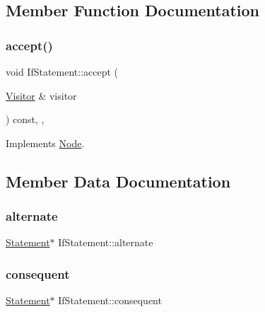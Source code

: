 \subsection{Member Function Documentation}
\mbox{\label{struct_if_statement_a3b9cacb85a094dfe27646324769a1d2f}} 
\subsubsection{\texorpdfstring{accept()}{accept()}}
{\footnotesize\ttfamily void If\+Statement\+::accept (\begin{DoxyParamCaption}\item[{\hyperlink{struct_visitor}{Visitor} \&}]{visitor }\end{DoxyParamCaption}) const\hspace{0.3cm}{\ttfamily [inline]}, {\ttfamily [override]}, {\ttfamily [virtual]}}



Implements \hyperlink{struct_node_a10bd7af968140bbf5fa461298a969c71}{Node}.



\subsection{Member Data Documentation}
\mbox{\label{struct_if_statement_ab0ee82460f6279444d526b2fff26584b}} 
\subsubsection{\texorpdfstring{alternate}{alternate}}
{\footnotesize\ttfamily \hyperlink{struct_statement}{Statement}$\ast$ If\+Statement\+::alternate}

\mbox{\label{struct_if_statement_a83d873df742779675de067315792ff8a}} 
\subsubsection{\texorpdfstring{consequent}{consequent}}
{\footnotesize\ttfamily \hyperlink{struct_statement}{Statement}$\ast$ If\+Statement\+::consequent}

